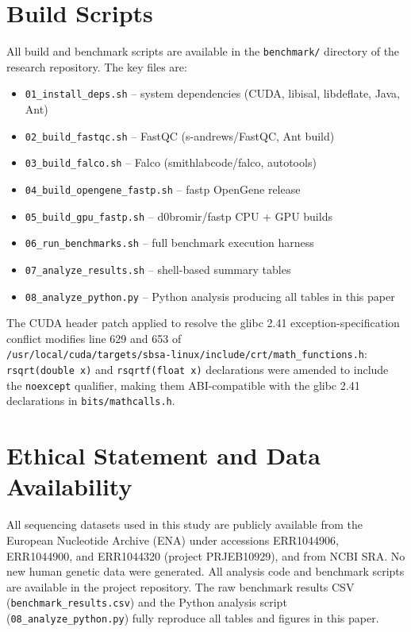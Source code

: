 \documentclass[a4paper,12pt]{article}
\begin{document}
\section{Build Scripts}
\label{app:scripts}

All build and benchmark scripts are available in the \texttt{benchmark/}
directory of the research repository.  The key files are:

\begin{itemize}
  \item \texttt{01\_install\_deps.sh} -- system dependencies (CUDA, libisal, libdeflate, Java, Ant)
  \item \texttt{02\_build\_fastqc.sh} -- FastQC (s-andrews/FastQC, Ant build)
  \item \texttt{03\_build\_falco.sh} -- Falco (smithlabcode/falco, autotools)
  \item \texttt{04\_build\_opengene\_fastp.sh} -- fastp OpenGene release
  \item \texttt{05\_build\_gpu\_fastp.sh} -- d0bromir/fastp CPU + GPU builds
  \item \texttt{06\_run\_benchmarks.sh} -- full benchmark execution harness
  \item \texttt{07\_analyze\_results.sh} -- shell-based summary tables
  \item \texttt{08\_analyze\_python.py} -- Python analysis producing all tables in this paper
\end{itemize}

\noindent The CUDA header patch applied to resolve the glibc 2.41 exception-specification
conflict modifies line 629 and 653 of\\
\texttt{/usr/local/cuda/targets/sbsa-linux/include/crt/math\_functions.h}:\\
\texttt{rsqrt(double x)} and \texttt{rsqrtf(float x)} declarations were amended
to include the \texttt{noexcept} qualifier, making them ABI-compatible with the
glibc 2.41 declarations in \texttt{bits/mathcalls.h}.

\section{Ethical Statement and Data Availability}
\label{app:ethics}

All sequencing datasets used in this study are publicly available from the
European Nucleotide Archive (ENA) under accessions ERR1044906, ERR1044900, and
ERR1044320 (project PRJEB10929), and from NCBI SRA.  No new human genetic data
were generated.  All analysis code and benchmark scripts are available in the
project repository.  The raw benchmark results CSV
(\texttt{benchmark\_results.csv}) and the Python analysis script
(\texttt{08\_analyze\_python.py}) fully reproduce all tables and figures in
this paper.
\end{document}
